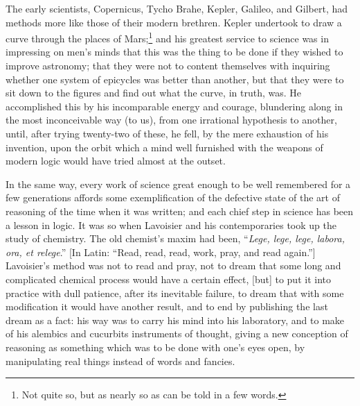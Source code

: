 \documentclass[]{article}
\newcounter{authornote}[page]
\newcommand{\authornote}[1]{\renewcommand{\thefootnote}{\fnsymbol{footnote}}\stepcounter{authornote}\footnote[\value{authornote}]{#1}\renewcommand{\thefootnote}{\arabic{footnote}}}
\begin{document}
The early scientists, Copernicus, Tycho Brahe, Kepler, Galileo, and Gilbert, had methods more like those of their modern brethren. Kepler undertook to draw a curve through the places of Mars;\authornote{Not quite so, but as nearly so as can be told in a few words.} and his greatest service to science was in impressing on men's minds that this was the thing to be done if they wished to improve astronomy; that they were not to content themselves with inquiring whether one system of epicycles was better than another, but that they were to sit down to the figures and find out what the curve, in truth, was. He accomplished this by his incomparable energy and courage, blundering along in the most inconceivable way (to us), from one irrational hypothesis to another, until, after trying twenty-two of these, he fell, by the mere exhaustion of his invention, upon the orbit which a mind well furnished with the weapons of modern logic would have tried almost at the outset.

In the same way, every work of science great enough to be well remembered for a few generations affords some exemplification of the defective state of the art of reasoning of the time when it was written; and each chief step in science has been a lesson in logic. It was so when Lavoisier and his contemporaries took up the study of chemistry. The old chemist's maxim had been, ``\emph{Lege, lege, lege, labora, ora, et relege}.'' [In Latin: ``Read, read, read, work, pray, and read again.''] Lavoisier's method was not to read and pray, not to dream that some long and complicated chemical process would have a certain effect, [but] to put it into practice with dull patience, after its inevitable failure, to dream that with some modification it would have another result, and to end by publishing the last dream as a fact: his way was to carry his mind into his laboratory, and to make of his alembics and cucurbits instruments of thought, giving a new conception of reasoning as something which was to be done with one's eyes open, by manipulating real things instead of words and fancies.
\end{document}
